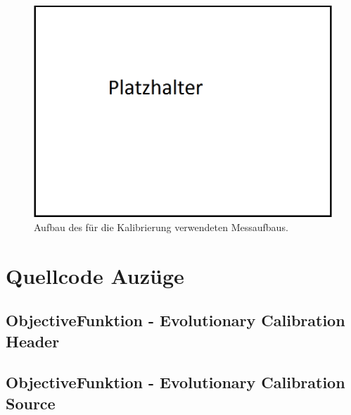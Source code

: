 \begin{appendix}
\begin{figure}[h!]
         \includegraphics[width=\textwidth]{img/00_Placeholder.png}
         \caption[Übersicht Kalibrieraufbau]{Aufbau des für die Kalibrierung verwendeten Messaufbaus.}
         \label{fig:Spider_setup1}
\end{figure}
\newpage
%
\chapter{Quellcode Auzüge}
\section{ObjectiveFunktion - Evolutionary Calibration Header}

\lstset{
	basicstyle=\scriptsize,
	language=C++,
	numbers=left,
	breaklines=true,
	frame=tbrl,
	breakatwhitespace=false
	breaklines=true,  
	xleftmargin=1cm,
	tabsize=2,
	showstringspaces=false}


\label{app:EvolutionaryCalibration1}
\newpage

\section{ObjectiveFunktion - Evolutionary Calibration Source}

\label{app:EvolutionaryCalibration2}
\newpage
%

\end{appendix}
